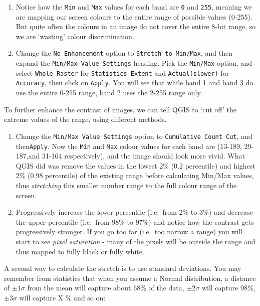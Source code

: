 \documentclass[
  letterpaper,
  DIV=11,
  numbers=noendperiod]{scrreprt}
\begin{document}
\begin{enumerate}
\def\labelenumi{(\arabic{enumi})}
\setcounter{enumi}{188}
\item
  Notice how the \texttt{Min} and \texttt{Max} values for each band are
  \texttt{0} and \texttt{255}, meaning we are mapping our screen colours
  to the entire range of possible values (0-255). But quite often the
  colours in an image do not cover the entire 8-bit range, so we are
  `wasting' colour discrimination.
\item
  Change the \texttt{No\ Enhancement} option to
  \texttt{Stretch\ to\ Min/Max}, and then expand the
  \texttt{Min/Max\ Value\ Settings} heading. Pick the \texttt{Min/Max}
  option, and select \texttt{Whole\ Raster} for
  \texttt{Statistics\ Extent} and \texttt{Actual(slower)} for
  \texttt{Accuracy}, then click on \texttt{Apply}. You will see that
  while band 1 and band 3 do use the entire 0-255 range, band 2 uses the
  2-255 range only.
\end{enumerate}

To further enhance the contrast of images, we can tell QGIS to `cut off'
the extreme values of the range, using different methods.

\begin{enumerate}
\def\labelenumi{(\arabic{enumi})}
\setcounter{enumi}{190}
\item
  Change the \texttt{Min/Max\ Value\ Settings} option to
  \texttt{Cumulative\ Count\ Cut}, and then\texttt{Apply}. Now the
  \texttt{Min} and \texttt{Max} colour values for each band are (13-189,
  29-187,and 31-164 respectively), and the image should look more vivid.
  What QGIS did was remove the values in the lowest 2\% (0.2 percentile)
  and highest 2\% (0.98 percentile) of the existing range before
  calculating Min/Max values, thus \emph{stretching} this smaller number
  range to the full colour range of the screen.
\item
  Progressively increase the lower percentile (i.e.~from 2\% to 3\%) and
  decrease the upper percentile (i.e.~from 98\% to 97\%) and notice how
  the contrast gets progressively stronger. If you go too far (i.e.~too
  narrow a range) you will start to see \emph{pixel saturation} - many
  of the pixels will be outside the range and thus mapped to fully black
  or fully white.
\end{enumerate}

A second way to calculate the stretch is to use standard deviations. You
may remember from statistics that when you assume a Normal distribution,
a distance of \(\pm 1 \sigma\) from the mean will capture about 68\% of
the data, \(\pm 2 \sigma\) will capture 98\%, \(\pm 3 \sigma\) will
capture X \% and so on:
\end{document}
